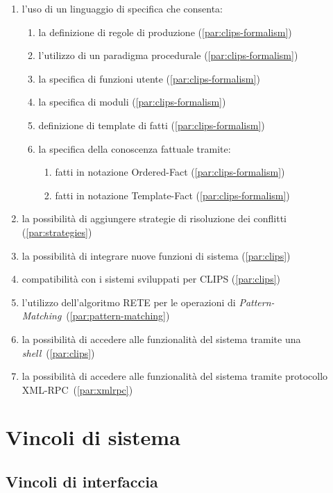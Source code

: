 \begin{enumerate}
	\item l'uso di un linguaggio di specifica che consenta:
		\begin{enumerate}
			\item la definizione di regole di produzione (\ref{par:clips-formalism})
			\item l'utilizzo di un paradigma procedurale (\ref{par:clips-formalism})
			\item la specifica di funzioni utente (\ref{par:clips-formalism})
			\item la specifica di moduli (\ref{par:clips-formalism})
			\item definizione di template di fatti (\ref{par:clips-formalism})
			\item la specifica della conoscenza fattuale tramite:
				\begin{enumerate}
					\item fatti in notazione Ordered-Fact (\ref{par:clips-formalism})
					\item fatti in notazione Template-Fact (\ref{par:clips-formalism})
				\end{enumerate}
		\end{enumerate}
	\item la possibilità di aggiungere strategie di risoluzione dei conflitti (\ref{par:strategies})
	\item la possibilità di integrare nuove funzioni di sistema (\ref{par:clips})
	\item compatibilità con i sistemi sviluppati per CLIPS (\ref{par:clips})
	\item l'utilizzo dell'algoritmo RETE per le operazioni di \emph{Pattern-Matching}~(\ref{par:pattern-matching})
	\item la possibilità di accedere alle funzionalità del sistema tramite una \emph{shell}~(\ref{par:clips})
	\item la possibilità di accedere alle funzionalità del sistema tramite protocollo XML-RPC~(\ref{par:xmlrpc})
\end{enumerate}


\section{Vincoli di sistema}
\vincoliinit
\subsection{Vincoli di interfaccia}

